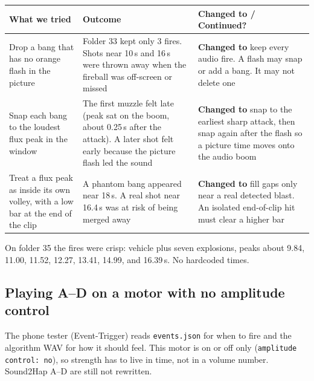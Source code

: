 \documentclass[11pt,a4paper]{article}
\begin{document}
\begin{center}
\small
\begin{tabularx}{\textwidth}{@{}>{\raggedright\arraybackslash}p{4cm}>{\raggedright\arraybackslash}p{4cm}>{\raggedright\arraybackslash}X@{}}
\toprule
\textbf{What we tried} & \textbf{Outcome} & \textbf{Changed to / Continued?} \\
\midrule
Drop a bang that has no orange flash in the picture & Folder 33 kept only 3 fires. Shots near 10\,s and 16\,s were thrown away when the fireball was off-screen or missed & \textbf{Changed to} keep every audio fire. A flash may snap or add a bang. It may not delete one \\
\addlinespace
Snap each bang to the loudest flux peak in the window & The first muzzle felt late (peak sat on the boom, about 0.25\,s after the attack). A later shot felt early because the picture flash led the sound & \textbf{Changed to} snap to the earliest sharp attack, then snap again after the flash so a picture time moves onto the audio boom \\
\addlinespace
Treat a flux peak as inside its own volley, with a low bar at the end of the clip & A phantom bang appeared near 18\,s. A real shot near 16.4\,s was at risk of being merged away & \textbf{Changed to} fill gaps only near a real detected blast. An isolated end-of-clip hit must clear a higher bar \\
\bottomrule
\end{tabularx}
\end{center}

On folder 35 the fires were crisp: vehicle plus seven explosions, peaks about 9.84, 11.00, 11.52, 12.27, 13.41, 14.99, and 16.39\,s. No hardcoded times.

\subsection*{Playing A--D on a motor with no amplitude control}
The phone tester (Event-Trigger) reads \texttt{events.json} for when to fire and the algorithm WAV for how it should feel. This motor is on or off only (\texttt{amplitude control: no}), so strength has to live in time, not in a volume number. Sound2Hap A--D are still not rewritten.
\end{document}
